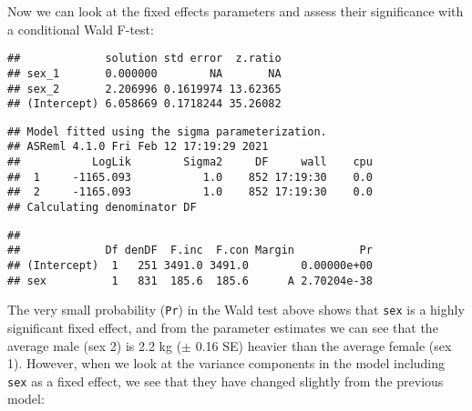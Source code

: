 \documentclass[12pt,]{book}
\newenvironment{Shaded}{\begin{snugshade}}{\end{snugshade}}
\newcommand{\DataTypeTok}[1]{\textcolor[rgb]{0.13,0.29,0.53}{#1}}
\newcommand{\KeywordTok}[1]{\textcolor[rgb]{0.13,0.29,0.53}{\textbf{#1}}}
\newcommand{\NormalTok}[1]{#1}
\newcommand{\OperatorTok}[1]{\textcolor[rgb]{0.81,0.36,0.00}{\textbf{#1}}}
\newcommand{\OtherTok}[1]{\textcolor[rgb]{0.56,0.35,0.01}{#1}}
\newcommand{\StringTok}[1]{\textcolor[rgb]{0.31,0.60,0.02}{#1}}
\begin{document}
Now we can look at the fixed effects parameters and assess their significance with a conditional Wald F-test:

\begin{Shaded}
\end{Shaded}

\begin{verbatim}
##             solution std error  z.ratio
## sex_1       0.000000        NA       NA
## sex_2       2.206996 0.1619974 13.62365
## (Intercept) 6.058669 0.1718244 35.26082
\end{verbatim}

\begin{verbatim}
## Model fitted using the sigma parameterization.
## ASReml 4.1.0 Fri Feb 12 17:19:29 2021
##           LogLik        Sigma2     DF     wall    cpu
##  1     -1165.093           1.0    852 17:19:30    0.0
##  2     -1165.093           1.0    852 17:19:30    0.0
## Calculating denominator DF
\end{verbatim}

\begin{verbatim}
## 
##             Df denDF  F.inc  F.con Margin          Pr
## (Intercept)  1   251 3491.0 3491.0        0.00000e+00
## sex          1   831  185.6  185.6      A 2.70204e-38
\end{verbatim}

The very small probability (\texttt{Pr}) in the Wald test above shows that \texttt{sex} is a highly significant fixed effect, and from the parameter estimates we can see that the average male (sex 2) is 2.2 kg (\(\pm\) 0.16 SE) heavier than the average female (sex 1). However, when we look at the variance components in the model including \texttt{sex} as a fixed effect, we see that they have changed slightly from the previous model:

\begin{Shaded}
\end{Shaded}
\end{document}
